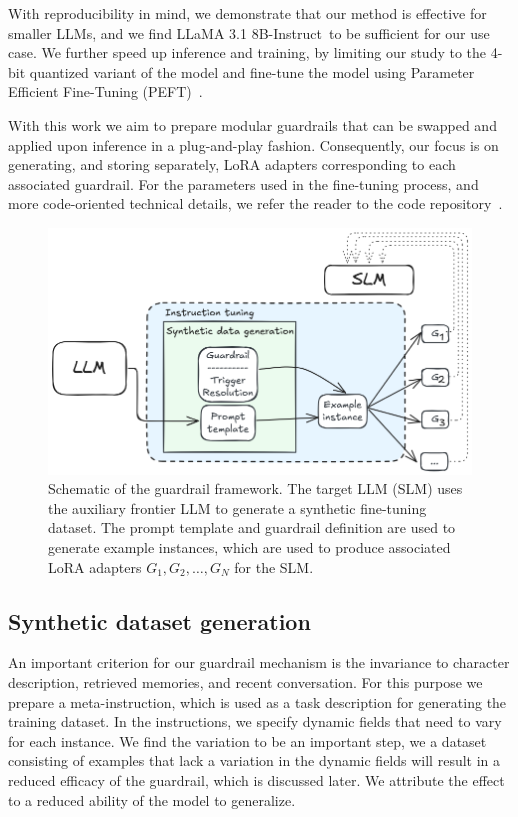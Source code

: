 \documentclass[letterpaper]{article}
\newcommand{\slmm}{LLaMA 3.1 8B-Instruct}
\begin{document}
With reproducibility in mind, we demonstrate that our method is effective for smaller LLMs, and we find \slmm~to be sufficient for our use case. We further speed up inference and training, by limiting our study to the 4-bit quantized variant of the model and fine-tune the model using Parameter Efficient Fine-Tuning (PEFT)~\cite{hu2021lora}. 

With this work we aim to prepare modular guardrails that can be swapped and applied upon inference in a plug-and-play fashion. 
Consequently, our focus is on generating, and storing separately, LoRA adapters corresponding to each associated guardrail. For the parameters used in the fine-tuning process, and more code-oriented technical details, we refer the reader to the code repository~\cite{code}.
\begin{figure}[h!]
	\centering
	\includegraphics[width=1.0\linewidth]{figures/datagenSchematic.png}
	\caption{Schematic of the guardrail framework. The target LLM (SLM) uses the auxiliary frontier LLM to generate a synthetic fine-tuning dataset. 
		The prompt template and guardrail definition are used to generate example instances, which are used to produce associated LoRA adapters $G_1, G_2, \ldots, G_N$ for the SLM.}\label{fig:method-schematic-label}
\end{figure} 
\subsection{Synthetic dataset generation}
An important criterion for our guardrail mechanism is the invariance to character description, retrieved memories, and recent conversation. For this purpose we prepare a meta-instruction, which is used as a task description for generating the training dataset. In the instructions, we specify dynamic fields that need to vary for each instance. We find the variation to be an important step, we a dataset consisting of examples that lack a variation in the dynamic fields will result in a reduced efficacy of the guardrail, which is discussed later. We attribute the effect to a reduced ability of the model to generalize.
\end{document}
